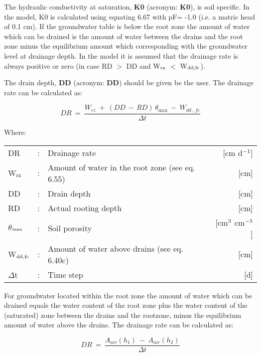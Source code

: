 The hydraulic conductivity at saturation, {\bf K0}  (acronym: {\bf K0}), is soil specific. In the
model, K0 is calculated using equating 6.67 with pF= -1.0 (i.e. a matric head of 0.1
cm). If the groundwater table is below the root zone the amount of water which can be
drained is the amount of water between the drains and the root zone minus the equilibrium 
amount which corresponding with the groundwater level at drainage depth. In the
model it is assumed that the drainage rate is always positive or zero (in case RD $>$ DD
and W$_{{\rm rz}}$ $<$ W$_{{\rm dd,fc}}$).

The drain depth, {\bf DD} (acronym: {\bf DD}) should be given be the user. The drainage rate can
be calculated as:

\begin{equation}
DR ~=~{\frac{W _{rz} ~+~ (DD\, -\, RD)\, \theta _{\max } ~-~ W _{dd\, ,\, fc} }{\Delta t}}
\end{equation}

Where:\\
\begin{tabularx}{\textwidth}{llXr}
DR &:& Drainage rate  & [cm d$^{{\rm -1}}$]\\
W$_{{\rm rz}}$ &:& Amount of water in the root zone (see eq. 6.55)  & [cm]\\
DD &:& Drain depth  & [cm]\\
RD &:& Actual rooting depth  & [cm]\\
$\theta$$_{{\rm max}}$ &:& Soil porosity  & [cm$^{{\rm 3}}$ cm$^{{\rm -3}}$]\\
W$_{{\rm dd,fc}}$ &:& Amount of water above drains (see eq. 6.40c)  & [cm]\\
$\Delta$t &:& Time step  & [d]\\ 
\end{tabularx}

For groundwater located within the root zone the amount of water which can be drained
equals the water content of the root zone plus the water content of the (saturated) zone
between the drains and the rootzone, minus the equilibrium amount of water above the
drains. The drainage rate can be calculated as:

\begin{equation}
DR ~=~{\frac{A_{air} (h_{1} )~-~ A_{air} (h_{2} )}{\Delta t}}
\end{equation}

